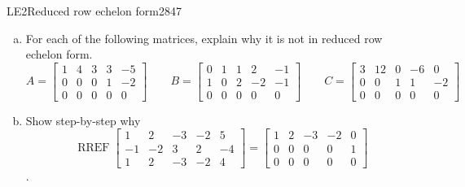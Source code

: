 \begin{exercise}{LE2}{Reduced row echelon form}{2847} 
\begin{exerciseStatement} 

\begin{enumerate}[(a)]
\item  

 For each of the following matrices, explain why it is not in reduced row echelon form. \[
                            A = \left[\begin{array}{ccccc}
1 & 4 & 3 & 3 & -5 \\
0 & 0 & 0 & 1 & -2 \\
0 & 0 & 0 & 0 & 0
\end{array}\right] \hspace{2em}
                            B = \left[\begin{array}{ccccc}
0 & 1 & 1 & 2 & -1 \\
1 & 0 & 2 & -2 & -1 \\
0 & 0 & 0 & 0 & 0
\end{array}\right] \hspace{2em}
                            C = \left[\begin{array}{ccccc}
3 & 12 & 0 & -6 & 0 \\
0 & 0 & 1 & 1 & -2 \\
0 & 0 & 0 & 0 & 0
\end{array}\right] \hspace{2em}
                        \hspace{2em}
                    \] 

 
\item  

 Show step-by-step why \[\operatorname{RREF}\left[\begin{array}{ccccc}
1 & 2 & -3 & -2 & 5 \\
-1 & -2 & 3 & 2 & -4 \\
1 & 2 & -3 & -2 & 4
\end{array}\right]=\left[\begin{array}{ccccc}
1 & 2 & -3 & -2 & 0 \\
0 & 0 & 0 & 0 & 1 \\
0 & 0 & 0 & 0 & 0
\end{array}\right]\]. 

 
\end{enumerate}

     \end{exerciseStatement}
 \begin{exerciseAnswer} 


\end{exerciseAnswer}
\end{exercise}
